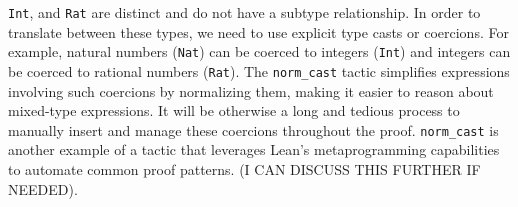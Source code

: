 \lstinline[language=lean]|Int|, and \lstinline[language=lean]|Rat|
are distinct and do not have a subtype relationship.
In order to translate between these types, we need to use explicit type casts or coercions.
For example, natural numbers (\lstinline[language=lean]|Nat|) can be coerced to integers (\lstinline[language=lean]|Int|) and integers can be coerced
to rational numbers (\lstinline[language=lean]|Rat|).
The \lstinline[language=lean]|norm_cast| tactic simplifies expressions involving such coercions
by normalizing them, making it easier to reason about mixed-type expressions.
It  will be otherwise a long and tedious process to manually insert and manage 
these coercions throughout the proof.
\lstinline[language=lean]|norm_cast| is another example of a tactic that leverages 
Lean's metaprogramming capabilities to automate common proof patterns. 
(I CAN DISCUSS THIS FURTHER IF NEEDED).

